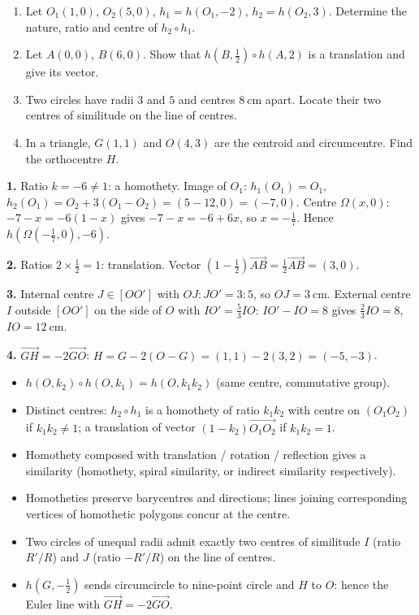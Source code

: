 \documentclass[11pt]{article}
\begin{document}
\begin{exercice}[Practice]
\begin{enumerate}
\item Let $O_1(1,0)$, $O_2(5,0)$, $h_1 = h(O_1, -2)$, $h_2 = h(O_2, 3)$. Determine the nature, ratio and centre of $h_2 \circ h_1$.
\item Let $A(0,0)$, $B(6,0)$. Show that $h(B, \tfrac12) \circ h(A, 2)$ is a translation and give its vector.
\item Two circles have radii $3$ and $5$ and centres $8\ \mathrm{cm}$ apart. Locate their two centres of similitude on the line of centres.
\item In a triangle, $G(1,1)$ and $O(4,3)$ are the centroid and circumcentre. Find the orthocentre $H$.
\end{enumerate}
\end{exercice}

\begin{corrige}[Exercise 1]
\textbf{1.} Ratio $k = -6 \neq 1$: a homothety. Image of $O_1$: $h_1(O_1) = O_1$, $h_2(O_1) = O_2 + 3(O_1 - O_2) = (5 - 12, 0) = (-7, 0)$. Centre $\Omega(x,0)$: $-7 - x = -6(1 - x)$ gives $-7 - x = -6 + 6x$, so $x = -\tfrac17$. Hence $h\!\left(\Omega\left(-\tfrac17, 0\right), -6\right)$.

\textbf{2.} Ratios $2 \times \tfrac12 = 1$: translation. Vector $(1 - \tfrac12)\vec{AB} = \tfrac12\vec{AB} = (3, 0)$.

\textbf{3.} Internal centre $J \in [OO']$ with $OJ : JO' = 3 : 5$, so $OJ = 3\ \mathrm{cm}$. External centre $I$ outside $[OO']$ on the side of $O$ with $IO' = \tfrac53 IO$: $IO' - IO = 8$ gives $\tfrac23 IO = 8$, $IO = 12\ \mathrm{cm}$.

\textbf{4.} $\vec{GH} = -2\vec{GO}$: $H = G - 2(O - G) = (1,1) - 2(3,2) = (-5, -3)$.
\end{corrige}

\begin{aretenir}
\begin{itemize}
\item $h(O,k_2) \circ h(O,k_1) = h(O, k_1k_2)$ (same centre, commutative group).
\item Distinct centres: $h_2 \circ h_1$ is a homothety of ratio $k_1k_2$ with centre on $(O_1O_2)$ if $k_1k_2 \neq 1$; a translation of vector $(1-k_2)\vec{O_1O_2}$ if $k_1k_2 = 1$.
\item Homothety composed with translation / rotation / reflection gives a similarity (homothety, spiral similarity, or indirect similarity respectively).
\item Homotheties preserve barycentres and directions; lines joining corresponding vertices of homothetic polygons concur at the centre.
\item Two circles of unequal radii admit exactly two centres of similitude $I$ (ratio $R'/R$) and $J$ (ratio $-R'/R$) on the line of centres.
\item $h(G, -\tfrac12)$ sends circumcircle to nine-point circle and $H$ to $O$: hence the Euler line with $\vec{GH} = -2\vec{GO}$.
\end{itemize}
\end{aretenir}
\end{document}
